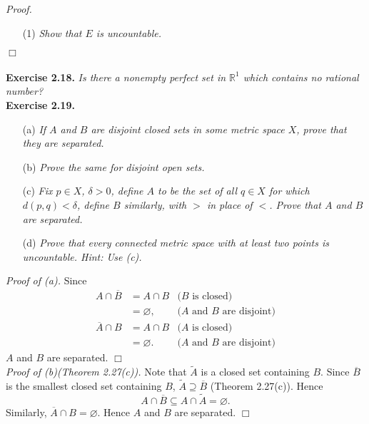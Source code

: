 \documentclass{article}
\begin{document}
\emph{Proof.}
\begin{enumerate}
\item[(1)]
\emph{Show that $E$ is uncountable.}
\end{enumerate}
$\Box$ \\\\






\textbf{Exercise 2.18.}
\emph{Is there a nonempty perfect set in $\mathbb{R}^1$ which contains no rational number?} \\






\textbf{Exercise 2.19.}
\begin{enumerate}
\item[(a)]
\emph{If $A$ and $B$ are disjoint closed sets in some metric space $X$,
prove that they are separated.}
\item[(b)]
\emph{Prove the same for disjoint open sets.}
\item[(c)]
\emph{Fix $p \in X$, $\delta > 0$,
define $A$ to be the set of all $q \in X$ for which $d(p,q) < \delta$,
define $B$ similarly, with $>$ in place of $<$.
Prove that $A$ and $B$ are separated.}
\item[(d)]
\emph{Prove that every connected metric space with at least two points
is uncountable.  Hint: Use (c).} \\
\end{enumerate}

\emph{Proof of (a).}
Since
\begin{align*}
A \cap \overline{B}
&= A \cap B
  &\text{($B$ is closed)} \\
&= \varnothing,
  &\text{($A$ and $B$ are disjoint)} \\
\overline{A} \cap B
&= A \cap B
  &\text{($A$ is closed)} \\
&= \varnothing.
  &\text{($A$ and $B$ are disjoint)}
\end{align*}
$A$ and $B$ are separated.
$\Box$ \\

\emph{Proof of (b)(Theorem 2.27(c)).}
Note that $\widetilde{A}$ is a closed set containing $B$.
Since $\overline{B}$ is the smallest closed set containing $B$,
$\widetilde{A} \supseteq \overline{B}$ (Theorem 2.27(c)).
Hence $$A \cap \overline{B} \subseteq A \cap \widetilde{A} = \varnothing.$$
Similarly, $\overline{A} \cap B = \varnothing$.
Hence $A$ and $B$ are separated.
$\Box$ \\
\end{document}
